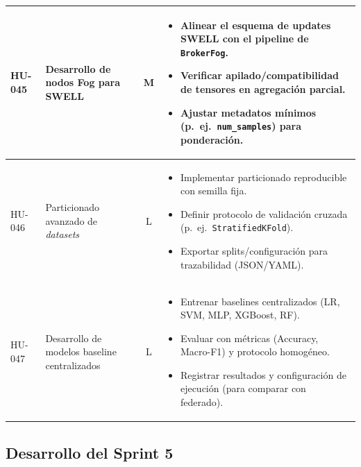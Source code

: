 \documentclass{report}
\begin{document}
\begin{table}[H]
\begin{tabular}{|l|p{4.8cm}|c|p{5.6cm}|}
HU-045 &
Desarrollo de nodos Fog para SWELL &
M &
\begin{itemize}\setlength\itemsep{0.2em}
  \item Alinear el esquema de updates SWELL con el pipeline de \texttt{BrokerFog}.
  \item Verificar apilado/compatibilidad de tensores en agregación parcial.
  \item Ajustar metadatos mínimos (p.\ ej.\ \texttt{num\_samples}) para ponderación.
\end{itemize}
\\ \hline

HU-046 &
Particionado avanzado de \textit{datasets} &
L &
\begin{itemize}\setlength\itemsep{0.2em}
  \item Implementar particionado reproducible con semilla fija.
  \item Definir protocolo de validación cruzada (p.\ ej.\ \texttt{StratifiedKFold}).
  \item Exportar splits/configuración para trazabilidad (JSON/YAML).
\end{itemize}
\\ \hline

HU-047 &
Desarrollo de modelos baseline centralizados &
L &
\begin{itemize}\setlength\itemsep{0.2em}
  \item Entrenar baselines centralizados (LR, SVM, MLP, XGBoost, RF).
  \item Evaluar con métricas (Accuracy, Macro-F1) y protocolo homogéneo.
  \item Registrar resultados y configuración de ejecución (para comparar con federado).
\end{itemize}
\\ \hline

\end{tabular}
\end{table}
\subsection{Desarrollo del Sprint 5}

\vspace{0.15em}
\end{document}
